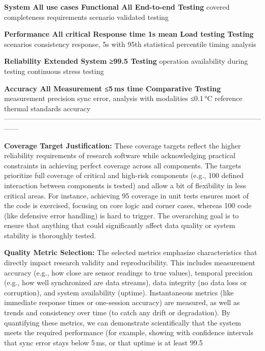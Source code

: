   \textbf{System        All use cases  Functional     All            End-to-end
  Testing}       covered        completeness   requirements   scenario
                                                validated      testing

  \textbf{Performance   All critical   Response time  \<1s mean      Load testing
  Testing}       scenarios      consistency    response, \<5s with
                                                95th           statistical
                                                percentile     timing analysis

  \textbf{Reliability   Extended       System         ≥99.5%
  Testing}       operation      availability   during testing continuous
                                                               stress testing

  \textbf{Accuracy      All            Measurement    ≤5 ms time     Comparative
  Testing}       measurement    precision      sync error,    analysis with
                  modalities                    ≤0.1 °C        reference
                                                thermal        standards
                                                accuracy       
  ------------------------------------------------------------------------------------------------------------------

\textbf{Coverage Target Justification:} These coverage targets reflect the
higher reliability requirements of research software while acknowledging
practical constraints in achieving perfect coverage across all
components\cite{ref13}.
The targets prioritize full coverage of critical and high-risk
components (e.g., 100%
defined interaction between components is tested) and allow a bit of
flexibility in less critical areas. For instance, achieving 95%
coverage in unit tests ensures most of the code is exercised, focusing
on core logic and corner cases, whereas 100%
code (like defensive error handling) is hard to trigger. The overarching
goal is to ensure that anything that could significantly affect data
quality or system stability is thoroughly tested.

\textbf{Quality Metric Selection:} The selected metrics emphasize
characteristics that directly impact research validity and
reproducibility\cite{ref14}.
This includes measurement accuracy (e.g., how close are sensor readings
to true values), temporal precision (e.g., how well synchronized are
data streams), data integrity (no data loss or corruption), and system
availability (uptime). Instantaneous metrics (like immediate response
times or one-session accuracy) are measured, as well as trends and
consistency over time (to catch any drift or degradation). By
quantifying these metrics, we can demonstrate scientifically that the
system meets the required performance (for example, showing with
confidence intervals that sync error stays below 5 ms, or that uptime is
at least 99.5%

